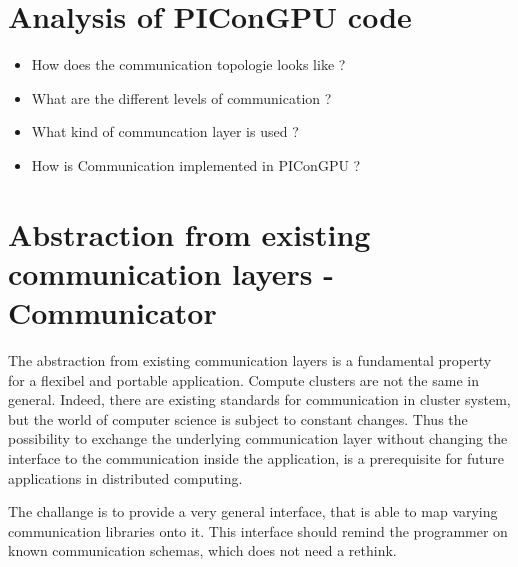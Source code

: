 \section{Analysis of PIConGPU code}
\begin{itemize}
  \item How does the communication topologie looks like ?
  \item What are the different levels of communication ?
  \item What kind of communcation layer is used ?
  \item How is Communication implemented in PIConGPU ?
\end{itemize}

\section{Abstraction from existing communication layers - Communicator}
The abstraction from existing communication layers is a fundamental
property for a flexibel and portable application. Compute clusters are
not the same in general. Indeed, there are existing standards for
communication in cluster system, but the world of computer science is
subject to constant changes. Thus the possibility to exchange the
underlying communication layer without changing the interface to the
communication inside the application, is a prerequisite for future
applications in distributed computing.

The challange is to provide a very general interface, that is able to
map varying communication libraries onto it. This interface should
remind the programmer on known communication schemas, which does not
need a rethink.

